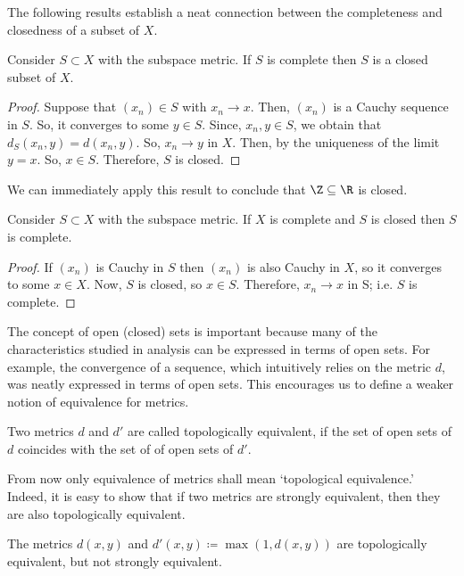 The following results establish a neat connection between the completeness and closedness of a subset of $X$.
\begin{nprop}
  Consider $S \subset X$ with the subspace metric. If $S$ is complete then $S$ is a closed subset of $X$.
\end{nprop}
\begin{proof}
  Suppose that $(x_n) \in S$ with $x_n \to x$. Then, $(x_n)$ is a Cauchy sequence in $S$. So, it converges to some $y \in S$. Since, $x_n, y \in S$, we obtain that $d_{S}(x_n, y) = d(x_n, y)$. So, $x_n \to y$ in $X$. Then, by the uniqueness of the limit $y=x$. So, $x \in S$. Therefore, $S$ is closed.
\end{proof}

\begin{negg}
  We can immediately apply this result to conclude that $\Z \subseteq \R$ is closed.
\end{negg}

\begin{nprop}
  Consider $S \subset X$ with the subspace metric. If $X$ is complete and $S$ is closed then $S$ is complete.
\end{nprop}
\begin{proof}
  If $(x_n)$ is Cauchy in $S$ then $(x_n)$ is also Cauchy in $X$, so it converges to some $x \in X$. Now, $S$ is closed, so $x \in S$. Therefore, $x_n \to x$ in S; i.e. $S$ is complete.
\end{proof}

The concept of open (closed) sets is important because many of the characteristics studied in analysis can be expressed in terms of open sets. For example, the convergence of a sequence, which intuitively relies on the metric $d$, was neatly expressed in terms of open sets. This encourages us to define a weaker notion of equivalence for metrics.
\begin{ndfn}
  Two metrics $d$ and $d'$ are called topologically equivalent, if the set of open sets of $d$ coincides with the set of of open sets of $d'$.
\end{ndfn}
From now only equivalence of metrics shall mean `topological equivalence.' Indeed, it is easy to show that if two metrics are strongly equivalent, then they are also topologically equivalent.

\begin{negg}
  The metrics $d(x,y)$ and $d'(x,y) \coloneq \max\left(1, d(x,y)\right)$ are topologically equivalent, but not strongly equivalent.
\end{negg}

